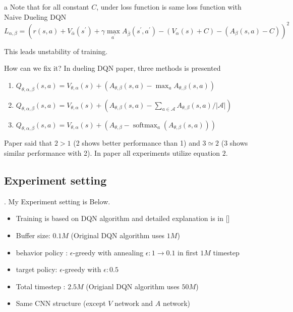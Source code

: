 \documentclass[8pt]{beamer}
\newcommand{\mc}[1]{\mathcal{#1}}
\newcommand{\abs}[1]{\left\lvert #1 \right\rvert}
\newcommand{\softmax}[2]{\operatorname{softmax}_{#1}\!\left(#2\right)}
\begin{document}
\begin{frame}{a}
    Note that for all constant $C$, under loss function is same loss function with Naive Dueling DQN
    \[
        L_{\alpha, \beta} = \left( r(s,a) + V_{\bar{\alpha}}(s^\prime) + \gamma \max_{a^\prime} A_{\bar{\beta}}(s^\prime, a^\prime) - (V_\alpha (s)+C) - (A_\beta (s,a)-C)  \right)^2
    \]

    This leads unstability of training.

    How can we fix it? In dueling DQN paper, three methods is presented
    \begin{enumerate}
        \item $Q_{\theta, \alpha, \beta}(s,a) = V_{\theta, \alpha} (s) + (A_{\theta, \beta}(s,a) - \max_{a}A_{\theta, \beta}(s,a))$
        \item $Q_{\theta, \alpha, \beta}(s,a) = V_{\theta, \alpha}(s) + (A_{\theta, \beta}(s,a) - \sum_{a \in \mc{A}} A_{\theta, \beta}(s,a)/\abs{\mc{A}})$
        \item $Q_{\theta, \alpha, \beta}(s,a) = V_{\theta, \alpha}(s) + (A_{\theta, \beta} - \softmax{a}{A_{\theta, \beta} (s,a)}) $
    \end{enumerate}

    Paper said that $2 > 1$ (2 shows better performance than 1) and $3 \simeq 2$ (3 shows similar performance with 2). In paper all experiments utilize equation $2$.
\end{frame}

\subsection{Experiment setting}


\begin{frame}{.}
    My Experiment setting is Below. 
    \begin{itemize}
        \item Training is based on DQN algorithm and detailed explanation is in [\cite{mnih2015human}]
        \item Buffer size: $0.1M$ (Original DQN algorithm uses $1M$)
        \item behavior policy : $\epsilon$-greedy with annealing $\epsilon : 1 \rightarrow 0.1$ in first $1M$ timestep
        \item target policy: $\epsilon$-greedy with $\epsilon: 0.5$
        \item Total timestep : $2.5M$ (Origianl DQN algorithm uses $50M$)
        \item Same CNN structure (except $V$ network and $A$ network)
    \end{itemize}
\end{frame}
\end{document}
